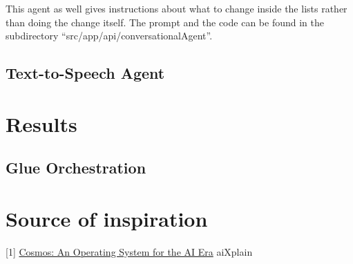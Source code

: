\documentclass{article}
\begin{document}
This agent as well gives instructions about what to change inside the lists rather than doing the change itself. The prompt and the code can be found in the subdirectory ``src/app/api/conversationalAgent''.


\subsection*{\color{draculayellow}Text-to-Speech Agent}

\section*{\color{draculagreen}Results}

\subsection*{\color{draculagreen}Glue Orchestration}

\section*{\color{draculagreen}Source of inspiration}

[1] \href{https://humane.com/media/cosmos-an-operating-system-for-the-ai-era}{Cosmos: An Operating System for the AI Era} \newline
[2] aiXplain
\end{document}
